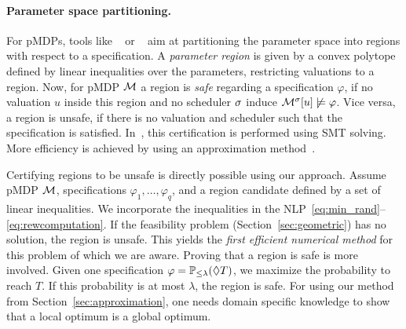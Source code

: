 \paragraph{Parameter space partitioning.}
For pMDPs, 
tools like ~\cite{KNP11} or ~\cite{dehnert-et-al-cav-2015} aim at partitioning the parameter space into regions with respect to a specification.
A \emph{parameter region} is given by a convex polytope defined by linear inequalities over the parameters, restricting valuations to a region. Now, for pMDP $\mathcal{M}$ a region is \emph{safe} regarding a specification $\varphi$, if no valuation $u$ inside this region and no scheduler $\sigma$ induce $\mathcal{M}^{\sigma}[u]\not\models\varphi$. Vice versa, a region is unsafe, if there is no valuation and scheduler such that the specification is satisfied. 
In~\cite{dehnert-et-al-cav-2015}, this certification is performed using SMT solving.
More efficiency is achieved by using an approximation method~\cite{quatmann-et-al-atva-2016}.

Certifying regions to be unsafe is directly possible using our approach.
Assume pMDP $\mathcal{M}$, specifications $\varphi_1,\ldots,\varphi_q$, and a region candidate defined by a set of linear inequalities.
We incorporate the inequalities in the NLP~\eqref{eq:min_rand}--\eqref{eq:rewcomputation}. If the feasibility problem (Section~\ref{sec:geometric}) has no solution, the region is unsafe. This yields the \emph{first efficient numerical method} for this problem of which we are aware.
Proving that a region is safe is more involved. Given one specification $\varphi=\mathbb{P}_{\leq \lambda}(\lozenge T)$, we maximize the probability to reach $T$. If this probability is at most $\lambda$, the region is safe. For using our method from Section~\ref{sec:approximation}, one needs domain specific knowledge to show that a local optimum is a global optimum.
%


